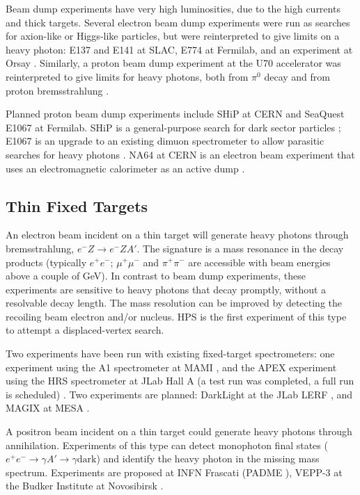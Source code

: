 Beam dump experiments have very high luminosities, due to the high currents and thick targets.
Several electron beam dump experiments were run as searches for axion-like or Higgs-like particles, but were reinterpreted to give limits on a heavy photon: E137 \cite{bjorken_search_1988} and E141 \cite{riordan_search_1987} at SLAC, E774 \cite{bross_search_1991} at Fermilab, and an experiment at Orsay \cite{davier_unambiguous_1989}.
Similarly, a proton beam dump experiment at the U70 accelerator was reinterpreted to give limits for heavy photons, both from $\pi^0$ decay and from proton bremsstrahlung \cite{blumlein_new_2014}.

Planned proton beam dump experiments include SHiP at CERN and SeaQuest E1067 at Fermilab.
SHiP is a general-purpose search for dark sector particles \cite{ship_collaboration_facility_2015}; E1067 is an upgrade to an existing dimuon spectrometer to allow parasitic searches for heavy photons \cite{gardner_new_2016}.
NA64 at CERN is an electron beam experiment that uses an electromagnetic calorimeter as an active dump \cite{gninenko_search_2014}.

\subsection{Thin Fixed Targets}
An electron beam incident on a thin target will generate heavy photons through bremsstrahlung, $e^- Z \to e^- Z A'$.
The signature is a mass resonance in the decay products (typically $e^+e^-$; $\mu^+\mu^-$ and $\pi^+\pi^-$ are accessible with beam energies above a couple of GeV).
In contrast to beam dump experiments, these experiments are sensitive to heavy photons that decay promptly, without a resolvable decay length.
The mass resolution can be improved by detecting the recoiling beam electron and/or nucleus.
HPS is the first experiment of this type to attempt a displaced-vertex search.

Two experiments have been run with existing fixed-target spectrometers: one experiment using the A1 spectrometer at MAMI \cite{merkel_search_2014}, and the APEX experiment using the HRS spectrometer at JLab Hall A (a test run was completed, a full run is scheduled) \cite{essig_electron_2011,abrahamyan_search_2011}.
Two experiments are planned: DarkLight at the JLab LERF \cite{balewski_darklight_2014}, and MAGIX at MESA \cite{denig_recent_2016}.

A positron beam incident on a thin target could generate heavy photons through annihilation.
Experiments of this type can detect monophoton final states ($e^+e^- \to \gamma A' \to \gamma \mathrm{dark}$) and identify the heavy photon in the missing mass spectrum. Experiments are proposed at INFN Frascati (PADME \cite{raggi_padme_2015}), VEPP-3 at the Budker Institute at Novosibirsk \cite{wojtsekhowski_searching_2012}.

